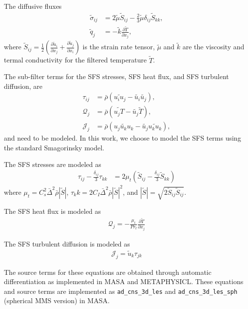 \documentclass[10pt]{article}
\newcommand{\pfrac}[2]{\frac{\partial#1}{\partial#2}}
\newcommand{\wt}[1]{\widetilde{#1}}
\begin{document}
The diffusive fluxes
\begin{align}
  \wt{\sigma}_{ij} &= 2 \wt{\mu} \wt{S}_{ij} - \frac{2}{3} \wt{\mu} \delta_{ij}  \wt{S}_{kk},\\
  \wt{q}_j &= - \wt{k} \pfrac{\wt{T}}{x_j},
\end{align}
where $\wt{S}_{ij} = \frac{1}{2} \left( \pfrac{\wt{u}_i}{x_j} +
\pfrac{\wt{u}_j}{x_i}\right)$ is the strain rate tensor, $\wt{\mu}$
and $\wt{k}$ are the viscosity and termal conductivity for the
filtered temperature $\wt{T}$.

The sub-filter terms for the SFS stresses, SFS heat flux, and SFS
turbulent diffusion, are
\begin{align}
  \tau_{ij} &= \bar{\rho} \left(\wt{u_i u_j} - \wt{u_i}\wt{u_j}\right),\\
  \mathcal{Q}_j &= \bar{\rho} \left(\wt{u_j T} - \wt{u_j}\wt{T}\right),\\
  \mathcal{J}_j &= \bar{\rho} \left(\wt{u_j u_k u_k} - \wt{u_j}\wt{u_k u_k}\right),
\end{align}
and need to be modeled. In this work, we choose to model the SFS terms
using the standard Smagorinsky model.

The SFS stresses are modeled as
\begin{align}
  \tau_{ij} - \frac{\delta_{ij}}{3} \tau_{kk} &= 2 \mu_t \left(\wt{S}_{ij} - \frac{\delta_{ij}}{3}  \wt{S}_{kk} \right)
\end{align}
where $\mu_t = C_s^2 \bar{\Delta}^2 \bar{\rho} |\wt{S}|$, $\tau_kk = 2
C_I \bar{\Delta}^2 \bar{\rho} |\wt{S}|^2$, and $|\wt{S}| = \sqrt{2
  \wt{S}_{ij}\wt{S}_{ij}}$.

The SFS heat flux is modeled as
\begin{align}
  \mathcal{Q}_j = - \frac{\mu_t}{Pr_t} \pfrac{\wt{T}}{x_j}
\end{align}

The SFS turbulent diffusion is modeled as
\begin{align}
  \mathcal{J}_j = \wt{u}_k \tau_{jk}
\end{align}

The source terms for these equations are obtained through automatic
differentiation as implemented in MASA and METAPHYSICL. These
equations and source terms are implemented as
\texttt{ad\_cns\_3d\_les} and  \texttt{ad\_cns\_3d\_les\_sph} (spherical MMS version) in MASA.
\end{document}
